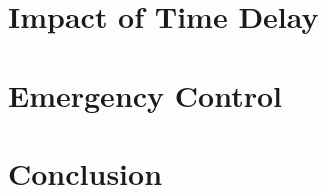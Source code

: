 \documentclass[12pt]{report}
\begin{document}
\chapter{Impact of Time Delay}
\label{Chapter5}





\chapter{Emergency Control}
\label{Chapter6}






\chapter{Conclusion}
\label{Chapter7}




\end{document}
